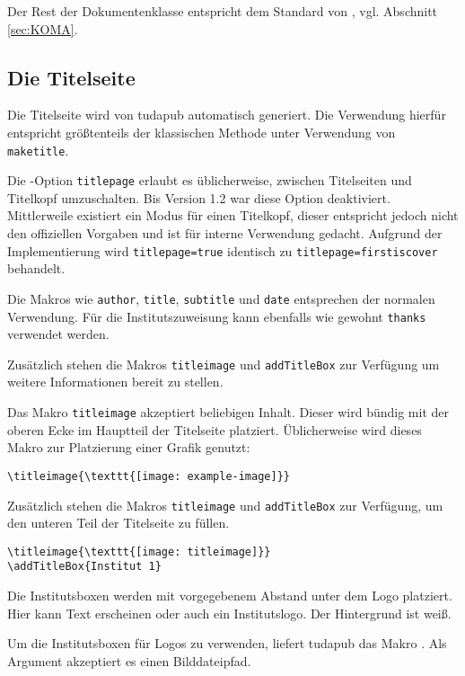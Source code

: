 \documentclass[
	ngerman,
	accentcolor=9c,%
	]{tudapub}
\let\code\texttt
\let\cls\textsf
\begin{document}
\noindent Der Rest der Dokumentenklasse entspricht dem Standard von \KOMAScript, vgl. Abschnitt \ref{sec:KOMA}.

\subsection{Die Titelseite}
\label{sec:title}

Die Titelseite wird von tudapub automatisch generiert. Die Verwendung hierfür entspricht größtenteils der klassischen Methode unter Verwendung von \code{maketitle}.

Die \KOMAScript-Option \code{titlepage} erlaubt es üblicherweise, zwischen Titelseiten und Titelkopf umzuschalten. Bis Version 1.2 war diese Option deaktiviert. Mittlerweile existiert ein Modus für einen Titelkopf, dieser entspricht jedoch nicht den offiziellen Vorgaben und ist für interne Verwendung gedacht. Aufgrund der Implementierung wird \code{titlepage=true} identisch zu \code{titlepage=firstiscover} behandelt.

Die Makros wie \code{author}, \code{title}, \code{subtitle} und \code{date} entsprechen der normalen Verwendung. Für die Institutszuweisung kann ebenfalls wie gewohnt \code{thanks} verwendet werden.

Zusätzlich stehen die Makros \code{titleimage} und \code{addTitleBox} zur Verfügung um weitere Informationen bereit zu stellen.

Das Makro \code{titleimage} akzeptiert beliebigen Inhalt. Dieser wird bündig mit der oberen Ecke im Hauptteil der Titelseite platziert.
Üblicherweise wird dieses Makro zur Platzierung einer Grafik genutzt:

\begin{verbatim}
\titleimage{\texttt{[image: example-image]}}
\end{verbatim}

Zusätzlich stehen die Makros \code{titleimage} und \code{addTitleBox} zur Verfügung, um den unteren Teil der Titelseite zu füllen.

\begin{verbatim}
\titleimage{\texttt{[image: titleimage]}}
\addTitleBox{Institut 1}
\end{verbatim}
Die Institutsboxen werden mit vorgegebenem Abstand unter dem Logo platziert. Hier kann Text erscheinen oder auch ein Institutslogo. Der Hintergrund ist weiß.

Um die Institutsboxen für Logos zu verwenden, liefert \cls{tudapub} das Makro \code{\addTitleBoxLogo}. Als Argument akzeptiert es einen Bilddateipfad.
\end{document}
